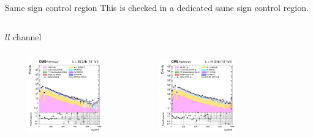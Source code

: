 \documentclass[8pt]{beamer}
\begin{document}
\begin{frame}{Same sign control region}
\justifying
This is checked in a dedicated same sign control region. \vfill
\begin{columns}
\begin{column}{1.09\textwidth}
\begin{block}{\centering $ll$ channel}\end{block}
\end{column}
\end{columns} \vspace{-5pt}
\begin{columns}
		\begin{column}{0.33\textwidth}
			\begin{center}
			\vspace{-8pt}
			\begin{block}{}\end{block}\vspace{10pt}
     			\includegraphics[width=1.0\textwidth, height=90pt]{figs/2016/log_cratio_SSCR_ll_mll.png}
    		\end{center}		
		\end{column} 
		\begin{column}{0.33\textwidth}
			\begin{center}
			\vspace{-8pt}
			\begin{block}{}\end{block}\vspace{10pt}
     			\includegraphics[width=1.0\textwidth, height=90pt]{figs/2017/log_cratio_SSCR_ll_mll.png}
    		\end{center}		
		\end{column} 
		\begin{column}{0.33\textwidth}
			\begin{center}

\end{center}
\end{column}
\end{columns}
\end{frame}
\end{document}
